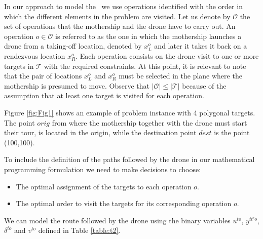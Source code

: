 In our approach to model the \AMD \ we use operations identified with the order in which the different elements in the problem are visited. Let us denote by $\mathcal O$ the set of operations that the mothership and the drone have to carry out. An operation $o\in\mathcal O$ is referred to as the one in which the mothership launches a drone from a taking-off location, denoted by $x_L^o$ and later it takes it back on a rendezvous location $x_R^o$. Each operation consists on the drone visit to one or more targets in $\mathcal T$ with the required constraints. At this point, it is relevant to note that the pair of locations $x_L^o$ and $x_R^o$ must be selected in the plane where the mothership is presumed to move. Observe that $|\mathcal O|\leq|\mathcal T|$ because of the assumption that at least one target is visited for each operation.





     
Figure \ref{fig:Fig1} shows an example of problem instance with 4 polygonal targets. The point $orig$ from where the mothership together with the drone must start their tour, is located in the origin, while the destination point $dest$ is the point (100,100).
    
     


To include the definition of the paths followed by the drone in our mathematical programming formulation we need to make decisions to choose:
\begin{itemize}
    \item The optimal assignment of the targets to each operation $o$.
    \item The optimal order to visit the targets for its corresponding operation $o$.
\end{itemize}


We can model the route followed by the drone using the binary variables $u^{to}$, $y^{tt'o}$, $\delta^{to}$ and $v^{to}$ defined in Table \ref{table:t2}.


